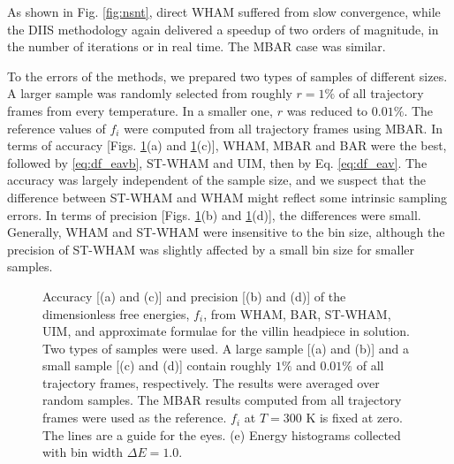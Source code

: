 \documentclass[aip,jcp,preprint,superscriptaddress]{revtex4-1}
\begin{document}
As shown in Fig. \ref{fig:nsnt},
direct WHAM suffered from slow convergence,
while the DIIS methodology again
delivered a speedup of two orders of magnitude,
in the number of iterations or in real time.
%
The MBAR case was similar.
%



To  the errors of the methods,
we prepared two types of samples of different sizes.
%
A larger sample was randomly selected from roughly $r = 1\%$
of all trajectory frames from every temperature.
%
In a smaller one, $r$ was reduced to $0.01\%$.
%
The reference values of $f_i$
were computed from all trajectory frames using MBAR.
%
In terms of accuracy
[Figs. \ref{fig:whamcmp}(a) and \ref{fig:whamcmp}(c)],
WHAM, MBAR and BAR were the best,
followed by  \eqref{eq:df_eavb},
 ST-WHAM and UIM,
then by Eq. \eqref{eq:df_eav}.
%
The accuracy was largely independent of the sample size,
and we suspect that the difference
between ST-WHAM and WHAM
might reflect some intrinsic sampling errors.
%
%
In terms of precision
[Figs. \ref{fig:whamcmp}(b) and \ref{fig:whamcmp}(d)],
the differences were small.
%
%
Generally,
WHAM and ST-WHAM were insensitive to the bin size,
although the precision of ST-WHAM was slightly affected
by a small bin size for smaller samples.



\begin{figure}[h]
  \caption{
    \label{fig:whamcmp}
    Accuracy [(a) and (c)] and precision [(b) and (d)] of
    the dimensionless free energies, $f_i$,
    from WHAM, BAR, ST-WHAM, UIM, and approximate formulae
    for the villin headpiece in solution.
    Two types of samples were used.
    A large sample [(a) and (b)]
    and
    a small sample [(c) and (d)]
    contain roughly
    $1\%$ and $0.01\%$ of all trajectory frames,
    respectively.
    The results were averaged over random samples.
    The MBAR results computed from all trajectory frames
    were used as the reference.
    $f_i$ at $T = 300$ K is fixed at zero.
    The lines are a guide for the eyes.
    (e) Energy histograms collected
    with bin width $\Delta E = 1.0$.
  }
\end{figure}
\end{document}
